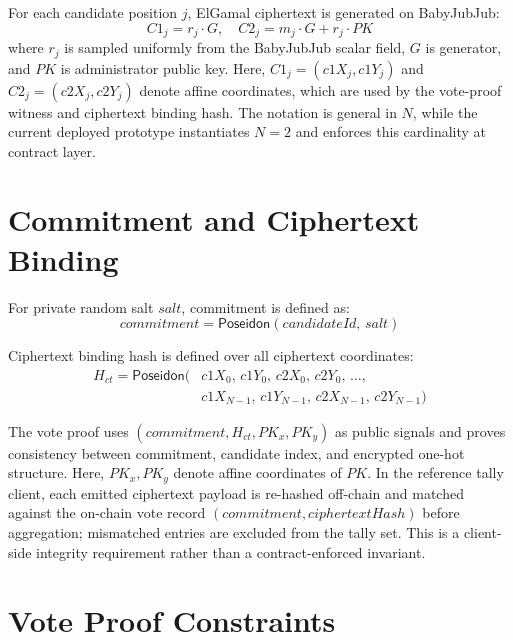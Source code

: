 For each candidate position $j$, ElGamal ciphertext is generated on BabyJubJub:
\begin{equation}
C1_j = r_j \cdot G, \quad C2_j = m_j \cdot G + r_j \cdot \mathit{PK}
\end{equation}
where $r_j$ is sampled uniformly from the BabyJubJub scalar field, $G$ is generator, and $\mathit{PK}$ is administrator public key. Here, $C1_j=(\mathit{c1X}_j,\mathit{c1Y}_j)$ and $C2_j=(\mathit{c2X}_j,\mathit{c2Y}_j)$ denote affine coordinates, which are used by the vote-proof witness and ciphertext binding hash. The notation is general in $N$, while the current deployed prototype instantiates $N=2$ and enforces this cardinality at contract layer.

\section{Commitment and Ciphertext Binding}

For private random salt $\mathit{salt}$, commitment is defined as:
\begin{equation}
\mathit{commitment} = \mathsf{Poseidon}(\mathit{candidateId},\, \mathit{salt})
\end{equation}

Ciphertext binding hash is defined over all ciphertext coordinates:
\begin{equation}
\begin{split}
H_{ct} = \mathsf{Poseidon}(&\mathit{c1X}_0,\,\mathit{c1Y}_0,\,\mathit{c2X}_0,\,\mathit{c2Y}_0,\,\dots,\\
                  &\mathit{c1X}_{N-1},\,\mathit{c1Y}_{N-1},\,\mathit{c2X}_{N-1},\,\mathit{c2Y}_{N-1})
\end{split}
\end{equation}

The vote proof uses $(\mathit{commitment}, H_{ct}, \mathit{PK}_x, \mathit{PK}_y)$ as public signals and proves consistency between commitment, candidate index, and encrypted one-hot structure.
Here, $\mathit{PK}_x, \mathit{PK}_y$ denote affine coordinates of $\mathit{PK}$.
In the reference tally client, each emitted ciphertext payload is re-hashed off-chain and matched against the on-chain vote record $(\mathit{commitment}, \mathit{ciphertextHash})$ before aggregation; mismatched entries are excluded from the tally set. This is a client-side integrity requirement rather than a contract-enforced invariant.

\section{Vote Proof Constraints}

